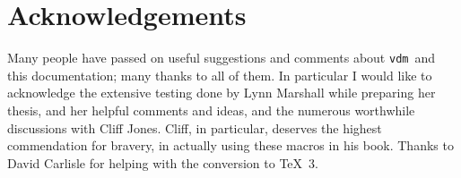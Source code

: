 \documentclass{article}
\newcommand{\Vdm}{{\tt vdm\/}}
\renewcommand{\^}[1]{$\langle${\rm #1\/}$\rangle$}
\begin{document}
\section{Acknowledgements}

Many people have passed on useful suggestions and comments about \Vdm\
and this documentation; many thanks to all of them.  In particular I
would like to acknowledge the extensive testing done by Lynn Marshall
while preparing her thesis, and her helpful comments and ideas, and
the numerous worthwhile discussions with Cliff Jones.  Cliff, in
particular, deserves the highest commendation for bravery, in actually
using these macros in his book.  Thanks to David Carlisle for helping
with the conversion to \TeX~3.
\end{document}
